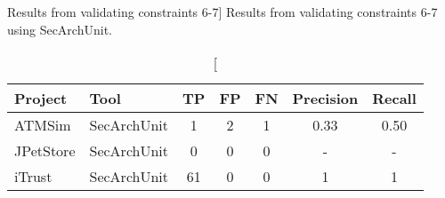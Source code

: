 \begin{table}
\captionsetup{justification=centering}
\caption
    [Results from validating constraints 6-7]
    {Results from validating constraints 6-7 using SecArchUnit.}
\begin{center}
\begin{tabular}{llccccc}
\textbf{Project} & \textbf{Tool}    & \textbf{TP} & \textbf{FP} & \textbf{FN} & \textbf{Precision} & \textbf{Recall} \\
\hline
ATMSim     & SecArchUnit & 1 & 2  & 1  & 0.33         & 0.50    \\
JPetStore  & SecArchUnit & 0 & 0  & 0  & -         & -    \\
iTrust     & SecArchUnit & 61 & 0  & 0  & 1         & 1    \\
\hline
\end{tabular}
\end{center}
\label{tab:tool_extension}
\end{table}